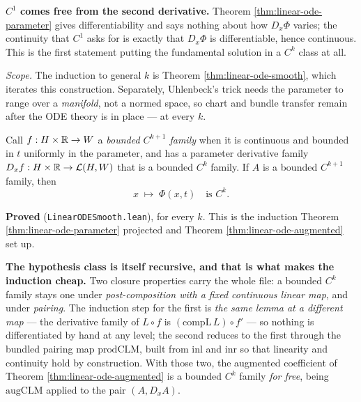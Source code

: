 \begin{theorem}
  \textbf{$C^1$ comes free from the second derivative.} Theorem
  \ref{thm:linear-ode-parameter} gives differentiability and says nothing about how $D_x\Phi$
  varies; the continuity that $C^1$ asks for is exactly that $D_x\Phi$ is differentiable, hence
  continuous. This is the first statement putting the fundamental solution in a $C^k$ class at
  all.

  \emph{Scope.} The induction to general $k$ is Theorem \ref{thm:linear-ode-smooth}, which
  iterates this construction. Separately, Uhlenbeck's trick needs the parameter to range over a
  \emph{manifold}, not a normed space, so chart and bundle transfer remain after the ODE theory
  is in place --- at every $k$.
\end{theorem}

\begin{theorem}
  \label{thm:linear-ode-smooth}
  \leanok
  Call $f : H \times \mathbb{R} \to W$ a \emph{bounded $C^{k+1}$ family} when it is continuous and
  bounded in $t$ uniformly in the parameter, and has a parameter derivative family
  $D_xf : H \times \mathbb{R} \to \mathcal{L}(H,W)$ that is a bounded $C^k$ family. If $A$ is a bounded
  $C^{k+1}$ family, then
  \[
    x \;\longmapsto\; \Phi(x,t) \quad\text{is } C^k .
  \]

  \textbf{Proved} (\texttt{LinearODESmooth.lean}), for every $k$. This is the induction
  Theorem \ref{thm:linear-ode-parameter} projected and Theorem
  \ref{thm:linear-ode-augmented} set up.

  \textbf{The hypothesis class is itself recursive, and that is what makes the induction
  cheap.} Two closure properties carry the whole file: a bounded $C^k$ family stays one under
  \emph{post-composition with a fixed continuous linear map}, and under \emph{pairing}. The
  induction step for the first is \emph{the same lemma at a different map} --- the derivative
  family of $L \circ f$ is $(\mathrm{compL}\,L)\circ f'$ --- so nothing is differentiated by
  hand at any level; the second reduces to the first through the bundled pairing map
  $\mathrm{prodCLM}$, built from $\mathrm{inl}$ and $\mathrm{inr}$ so that linearity and
  continuity hold by construction. With those two, the augmented coefficient of Theorem
  \ref{thm:linear-ode-augmented} is a bounded $C^k$ family \emph{for free}, being
  $\mathrm{augCLM}$ applied to the pair $(A, D_xA)$.


\end{theorem}
